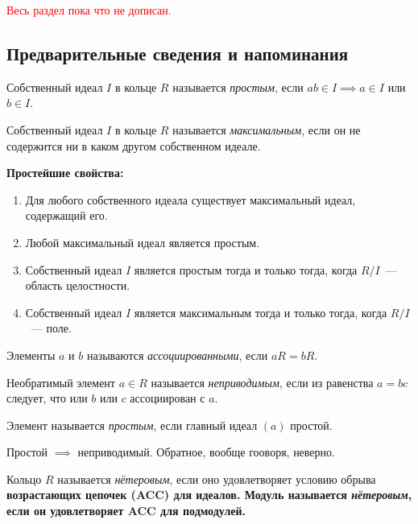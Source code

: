 \begin{remark}
	\textcolor{red}{Весь раздел  пока что не дописан.}
\end{remark}

\subsection{Предварительные сведения и напоминания}



\begin{definition}
	Собственный идеал $I$ в кольце $R$ называется \emph{простым}, если $ab \in I \implies a \in I$ или $b \in I$.

	Собственный идеал $I$ в кольце $R$ называется \emph{максимальным}, если он не содержится ни в каком другом собственном идеале.
\end{definition}

\noindent\bf{Простейшие свойства:}

\begin{enumerate}
	\item Для любого собственного идеала существует максимальный идеал, содержащий его. 

	\item Любой максимальный идеал является простым. 

	\item Собственный идеал $I$ является простым тогда и только тогда, когда $R/I$~--- область целостности. 

	\item Собственный идеал $I$ является максимальным тогда и только тогда, когда $R/I$~--- поле. 
\end{enumerate}

\begin{definition} 
	Элементы $a$ и $b$ называются \emph{ассоциированными}, если $aR = bR$.

	Необратимый элемент $a \in R$ называется \emph{неприводимым}, если из равенства $a = bc$ следует, что или $b$ или $c$ ассоциирован с $a$.

	Элемент называется \emph{простым}, если главный идеал $(a)$  простой. 
\end{definition}

\begin{remark}
	Простой $\implies$ неприводимый. Обратное, вообще гооворя, неверно. 
\end{remark}

\begin{definition} 
	Кольцо $R$ называется \emph{нётеровым}, если оно удовлетворяет условию обрыва \bf{возрастающих} цепочек (ACC) для идеалов. 
	Модуль называется \emph{нётеровым}, если он удовлетворяет ACC для подмодулей. 
\end{definition}

